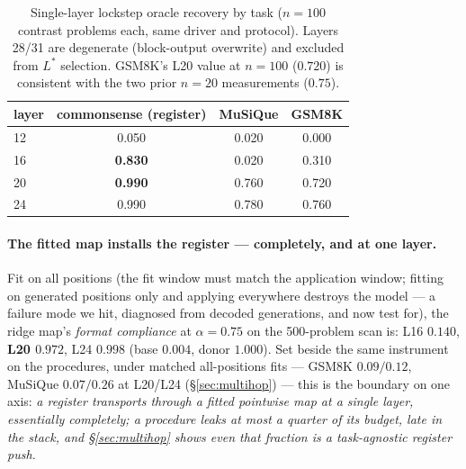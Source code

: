 \documentclass{article}
\begin{document}
\begin{table}[t]
\centering
\caption{Single-layer lockstep oracle recovery by task ($n{=}100$ contrast problems each, same
driver and protocol). Layers 28/31 are degenerate (block-output overwrite) and excluded from
$L^*$ selection. GSM8K's L20 value at $n{=}100$ ($0.720$) is consistent with the two prior
$n{=}20$ measurements ($0.75$).}
\label{tab:oracle}
\small
\begin{tabular}{lccc}
\toprule
layer & commonsense (register) & MuSiQue & GSM8K \\
\midrule
12 & 0.050 & 0.020 & 0.000 \\
16 & \textbf{0.830} & 0.020 & 0.310 \\
20 & \textbf{0.990} & 0.760 & 0.720 \\
24 & 0.990 & 0.780 & 0.760 \\
\bottomrule
\end{tabular}
\end{table}

\paragraph{The fitted map installs the register --- completely, and at one layer.} Fit on all
positions (the fit window must match the application window; fitting on generated positions only
and applying everywhere destroys the model --- a failure mode we hit, diagnosed from decoded
generations, and now test for), the ridge map's \emph{format compliance} at $\alpha{=}0.75$ on the
500-problem scan is: L16 $0.140$, \textbf{L20 $0.972$}, L24 $0.998$ (base $0.004$, donor $1.000$).
Set beside the same instrument on the procedures, under matched all-positions fits --- GSM8K
$0.09/0.12$, MuSiQue $0.07/0.26$ at L20/L24 (\S\ref{sec:multihop}) --- this is the boundary on one
axis: \emph{a register transports through a fitted pointwise map at a single layer, essentially
completely; a procedure leaks at most a quarter of its budget, late in the stack, and
\S\ref{sec:multihop} shows even that fraction is a task-agnostic register push.}
\end{document}
